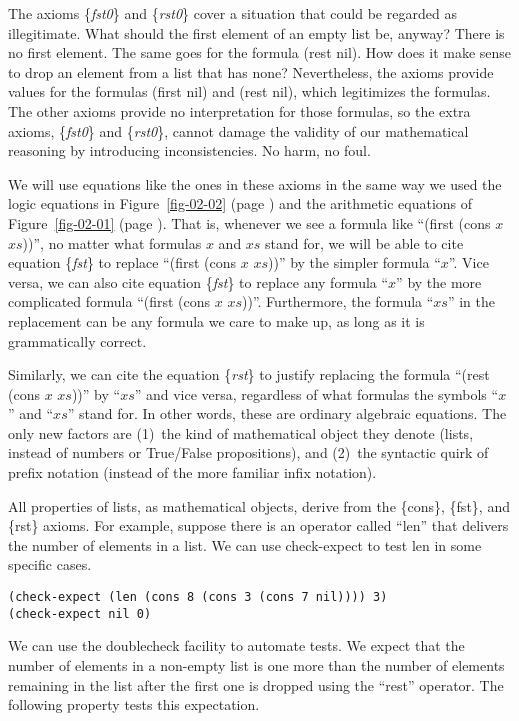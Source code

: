 The axioms \{\emph{fst0}\} and \{\emph{rst0}\} cover a situation
that could be regarded as illegitimate. What should the first element
of an empty list be, anyway? There is no first element.
The same goes for the formula (rest nil).
How does it make sense to drop an element from a list that has none?
Nevertheless, the axioms provide values for the formulas (first nil) and (rest nil),
which legitimizes the formulas.
The other axioms provide no interpretation for those formulas,
so the extra axioms, \{\emph{fst0}\} and \{\emph{rst0}\},
cannot damage the validity of our mathematical reasoning
by introducing inconsistencies. No harm, no foul.

We will use equations like the ones in these axioms in the
same way we used the logic equations in Figure~\ref{fig-02-02}
(page \pageref{fig-02-02}) and the arithmetic equations of
Figure~\ref{fig-02-01} (page \pageref{fig-02-01}).
That is, whenever we see a formula like ``(first (cons $x$ $xs$))'',
no matter what formulas $x$ and $xs$ stand for,
we will be able to cite equation \{\emph{fst}\} to replace
``(first (cons $x$ $xs$))'' by the simpler formula ``$x$''.
Vice versa, we can also cite equation \{\emph{fst}\}
to replace any formula ``$x$'' by the more complicated formula
``(first (cons $x$ $xs$))''.
Furthermore, the formula ``$xs$'' in the replacement can be
any formula we care to make up, as long as it is grammatically correct.

Similarly, we can cite the equation \{\emph{rst}\} to justify
replacing the formula ``(rest (cons $x$ $xs$))'' by ``$xs$''
and vice versa, regardless of what formulas the symbols ``$x$'' and ``$xs$'' stand for.
In other words, these are ordinary algebraic equations.
The only new factors are
(1)~the kind of mathematical object they denote (lists, instead of numbers or True/False propositions), and
(2)~the syntactic quirk of prefix notation (instead of the more familiar infix notation).

All properties of lists, as mathematical objects, derive from the \{cons\}, \{fst\}, and \{rst\} axioms.
For example, suppose there is an operator called ``len''
that delivers the number of elements in a list.
We can use check-expect to test len in some specific cases.

\begin{Verbatim}
(check-expect (len (cons 8 (cons 3 (cons 7 nil)))) 3)
(check-expect nil 0)
\end{Verbatim}

We can use the doublecheck facility to automate tests.
We expect that the number of elements in a non-empty list
is one more than the number of elements remaining in the list
after the first one is dropped using the ``rest'' operator.
The following property tests this expectation.

